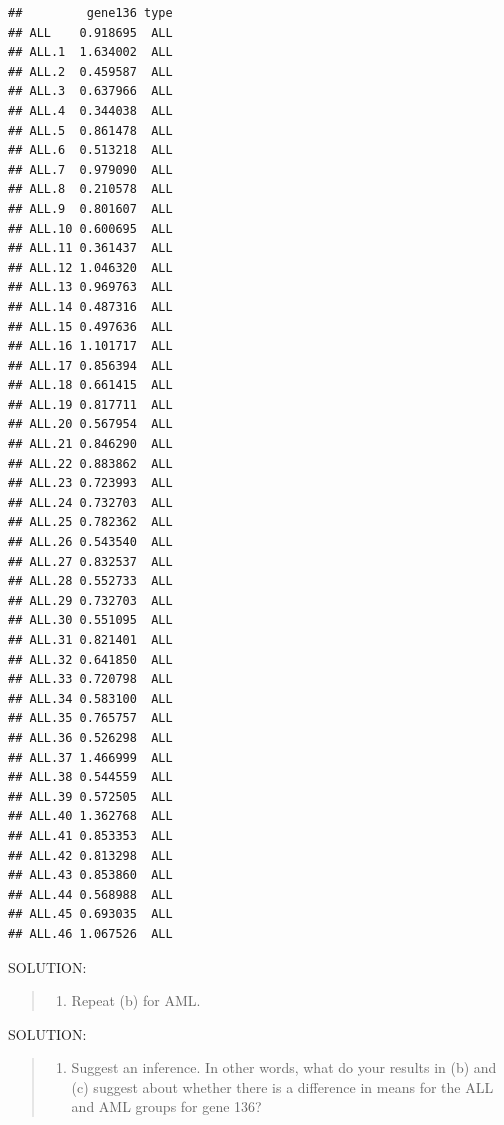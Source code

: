 \documentclass[
]{article}
\newenvironment{Shaded}{\begin{snugshade}}{\end{snugshade}}
\newcommand{\AttributeTok}[1]{\textcolor[rgb]{0.77,0.63,0.00}{#1}}
\newcommand{\CommentTok}[1]{\textcolor[rgb]{0.56,0.35,0.01}{\textit{#1}}}
\newcommand{\DecValTok}[1]{\textcolor[rgb]{0.00,0.00,0.81}{#1}}
\newcommand{\FunctionTok}[1]{\textcolor[rgb]{0.00,0.00,0.00}{#1}}
\newcommand{\NormalTok}[1]{#1}
\newcommand{\OtherTok}[1]{\textcolor[rgb]{0.56,0.35,0.01}{#1}}
\newcommand{\SpecialCharTok}[1]{\textcolor[rgb]{0.00,0.00,0.00}{#1}}
\providecommand{\tightlist}{%
  \setlength{\itemsep}{0pt}\setlength{\parskip}{0pt}}
\begin{document}
\begin{verbatim}
##         gene136 type
## ALL    0.918695  ALL
## ALL.1  1.634002  ALL
## ALL.2  0.459587  ALL
## ALL.3  0.637966  ALL
## ALL.4  0.344038  ALL
## ALL.5  0.861478  ALL
## ALL.6  0.513218  ALL
## ALL.7  0.979090  ALL
## ALL.8  0.210578  ALL
## ALL.9  0.801607  ALL
## ALL.10 0.600695  ALL
## ALL.11 0.361437  ALL
## ALL.12 1.046320  ALL
## ALL.13 0.969763  ALL
## ALL.14 0.487316  ALL
## ALL.15 0.497636  ALL
## ALL.16 1.101717  ALL
## ALL.17 0.856394  ALL
## ALL.18 0.661415  ALL
## ALL.19 0.817711  ALL
## ALL.20 0.567954  ALL
## ALL.21 0.846290  ALL
## ALL.22 0.883862  ALL
## ALL.23 0.723993  ALL
## ALL.24 0.732703  ALL
## ALL.25 0.782362  ALL
## ALL.26 0.543540  ALL
## ALL.27 0.832537  ALL
## ALL.28 0.552733  ALL
## ALL.29 0.732703  ALL
## ALL.30 0.551095  ALL
## ALL.31 0.821401  ALL
## ALL.32 0.641850  ALL
## ALL.33 0.720798  ALL
## ALL.34 0.583100  ALL
## ALL.35 0.765757  ALL
## ALL.36 0.526298  ALL
## ALL.37 1.466999  ALL
## ALL.38 0.544559  ALL
## ALL.39 0.572505  ALL
## ALL.40 1.362768  ALL
## ALL.41 0.853353  ALL
## ALL.42 0.813298  ALL
## ALL.43 0.853860  ALL
## ALL.44 0.568988  ALL
## ALL.45 0.693035  ALL
## ALL.46 1.067526  ALL
\end{verbatim}

\begin{Shaded}
\end{Shaded}

SOLUTION:

\begin{quote}
\begin{enumerate}
\def\labelenumi{(\alph{enumi})}
\setcounter{enumi}{2}
\tightlist
\item
  Repeat (b) for AML.
\end{enumerate}
\end{quote}

SOLUTION:

\begin{quote}
\begin{enumerate}
\def\labelenumi{(\alph{enumi})}
\setcounter{enumi}{3}
\tightlist
\item
  Suggest an inference. In other words, what do your results in (b) and
  (c) suggest about whether there is a difference in means for the ALL
  and AML groups for gene 136?
\end{enumerate}
\end{quote}
\end{document}

